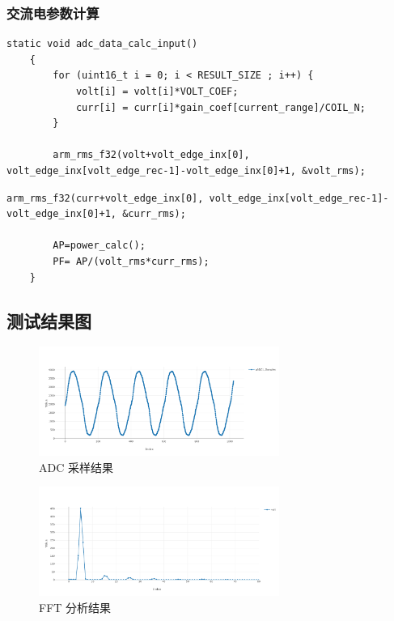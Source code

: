 \documentclass[a4paper,12pt,UTF8]{article}
\begin{document}
\subsubsection{交流电参数计算}
\begin{lstlisting}[style=Cstyle, name=calc]
    static void adc_data_calc_input()
    {
        for (uint16_t i = 0; i < RESULT_SIZE ; i++) {
            volt[i] = volt[i]*VOLT_COEF;
            curr[i] = curr[i]*gain_coef[current_range]/COIL_N;
        }

        arm_rms_f32(volt+volt_edge_inx[0], volt_edge_inx[volt_edge_rec-1]-volt_edge_inx[0]+1, &volt_rms);
\end{lstlisting}
\begin{lstlisting}[style=Cstyle, name=calc]
        arm_rms_f32(curr+volt_edge_inx[0], volt_edge_inx[volt_edge_rec-1]-volt_edge_inx[0]+1, &curr_rms);

        AP=power_calc();
        PF= AP/(volt_rms*curr_rms);
    }
\end{lstlisting}

\subsection{测试结果图}\label{res}
\begin{figure}[H]
    \centering
    \includegraphics[width=0.7\textwidth]{figures/adc.png}
    \caption{ADC 采样结果}
\end{figure}
\begin{figure}[H]
    \centering
    \includegraphics[width=0.7\textwidth]{figures/volt_fft.png}
    \caption{FFT 分析结果}
\end{figure}


\end{document}
